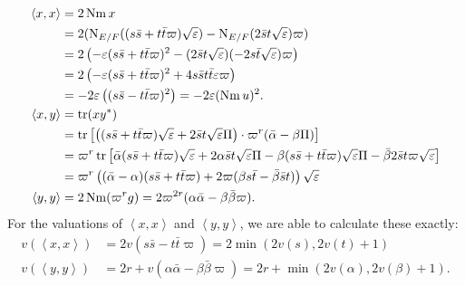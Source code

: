 \begin{align*}
  \left\langle x,x \right\rangle &= 2 \operatorname{Nm} x \\
  &= 2 (\operatorname{N}_{E/F}((s \bar s + t \bar t \varpi)\sqrt{\varepsilon})
    - \operatorname{N}_{E/F}(2 \bar s t \sqrt{\varepsilon}) \varpi) \\
  &= 2\left( -\varepsilon(s \bar s + t \bar t \varpi)^2
    - (2\bar s t \sqrt{\varepsilon})(-2s \bar t \sqrt{\varepsilon}) \varpi \right) \\
  &= 2\left( -\varepsilon(s \bar s + t \bar t \varpi)^2
    + 4s\bar s t \bar t \varepsilon \varpi \right) \\
  &= -2\varepsilon\left( (s \bar s - t \bar t \varpi)^2 \right) = -2\varepsilon (\operatorname{Nm} u)^2. \\
  \left\langle x,y \right\rangle &= \operatorname{tr}(x y^\ast) \\
  &= \operatorname{tr} \left[
    \left( (s \bar s + t \bar t \varpi) \sqrt{\varepsilon} + 2 \bar s t \sqrt{\varepsilon} \Pi \right)
    \cdot \varpi^{r} (\bar\alpha - \beta \Pi)
  \right] \\
  &= \varpi^r \operatorname{tr} \left[
    \bar\alpha (s \bar s + t \bar t \varpi) \sqrt{\varepsilon}
    + 2 \alpha \bar s t \sqrt{\varepsilon} \Pi
    - \beta (s \bar s + t \bar t \varpi) \sqrt{\varepsilon} \Pi
    - \bar\beta 2 \bar s t \varpi \sqrt{\varepsilon}
  \right] \\
  &= \varpi^r \left(
    (\bar\alpha - \alpha)(s \bar s + t \bar t \varpi)
    + 2\varpi(\beta s \bar t - \bar\beta \bar s t)
  \right) \sqrt{\varepsilon} \\
  \left\langle y,y \right\rangle &= 2 \operatorname{Nm} (\varpi^r g)
  = 2\varpi^{2r} (\alpha \bar\alpha - \beta\bar\beta \varpi).
\end{align*}
For the valuations of $\left\langle x,x \right\rangle$ and $\left\langle y,y \right\rangle$,
we are able to calculate these exactly:
\begin{align*}
  v(\left\langle x,x \right\rangle)
  &= 2v\left( s \bar s - t \bar t \varpi \right)
  = 2\min\left( 2v(s), 2v(t) +1 \right) \\
  v\left( \left\langle y,y \right\rangle \right)
  &= 2r + v\left( \alpha \bar \alpha - \beta \bar \beta \varpi \right)
  = 2r + \min\left( 2v(\alpha), 2v(\beta) + 1 \right).
\end{align*}

